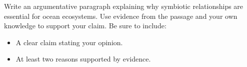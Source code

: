 \documentclass[12pt]{article}
\begin{document}
\begin{tcolorbox}[colframe=black!50, colback=white, title=Question 10: Writing Performance Task]
Write an argumentative paragraph explaining why symbiotic relationships are essential for ocean ecosystems. Use evidence from the passage and your own knowledge to support your claim. Be sure to include:  
\begin{itemize}
    \item A clear claim stating your opinion.  
    \item At least two reasons supported by evidence.   
\end{itemize}

\vspace{2em}
\\[0.8cm] \underline{\hspace{15.8cm}}  
    \\[0.8cm] \underline{\hspace{15.8cm}}  
    \\[0.8cm] \underline{\hspace{15.8cm}}  
    \\[0.8cm] \underline{\hspace{15.8cm}}  
    \\[0.8cm] \underline{\hspace{15.8cm}}  
     \\[0.8cm] \underline{\hspace{15.8cm}}  
\end{tcolorbox}

\newpage
\end{document}
